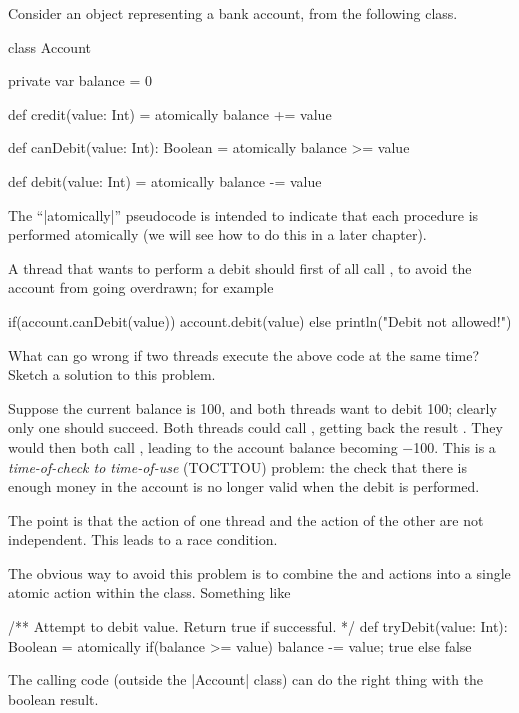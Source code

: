 \begin{questionS}
\label{exercise:account}
Consider an object representing a bank account, from the following class.
%
\begin{scala}
class Account{
  private var balance = 0

  def credit(value: Int) = atomically{ balance += value }

  def canDebit(value: Int): Boolean = atomically{ balance >= value }

  def debit(value: Int) = atomically{ balance -= value }
}
\end{scala}
%
The ``|atomically|'' pseudocode is intended to indicate that each
procedure is performed atomically (we will see how to do this in a
later chapter).

A thread that wants to perform a debit should first of all call
, to avoid the account from going overdrawn; for example
%
\begin{scala}[showstringspaces=false]
  if(account.canDebit(value)) account.debit(value)
  else println("Debit not allowed!")
\end{scala}

What can go wrong if two threads execute the above code at the same
time?  Sketch a solution to this problem.
\end{questionS}


\begin{answerS}
Suppose the current balance is 100, and both threads want to debit 100;
clearly only one should succeed.  Both threads could call
, getting back the result .  They would
then both call , leading to the account balance becoming $-$100.
This is a \emph{time-of-check to time-of-use} (TOCTTOU) problem: the check
that there is enough money in the account is no longer valid when the debit is
performed.

The point is that the  action of one thread and the
 action of the other are not independent.  This leads to a race
condition.

The obvious way to avoid this problem is to combine the  and
 actions into a single atomic action within the 
class.  Something like
%
\begin{scala}
/** Attempt to debit value.  Return true if successful. */
def tryDebit(value: Int): Boolean = atomically{
  if(balance >= value){ balance -= value; true } else false
}
\end{scala}
% 
The calling code (outside the |Account| class) can do the right thing with the
boolean result. 
\end{answerS}

